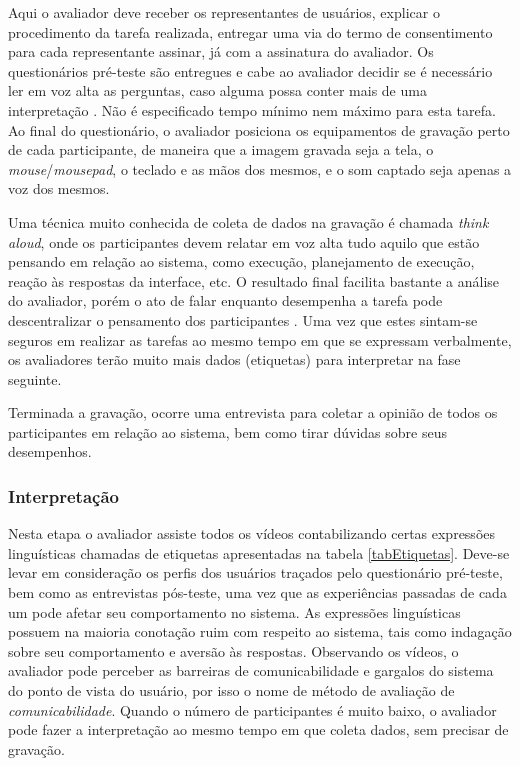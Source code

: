 \indent Aqui o avaliador deve receber os representantes de usuários, explicar o procedimento da tarefa realizada, entregar uma via do termo de consentimento para cada representante assinar, já com a assinatura do avaliador. Os questionários pré-teste são entregues e cabe ao avaliador decidir se é necessário ler em voz alta as perguntas, caso alguma possa conter mais de uma interpretação \cite[p. 309]{IHCbook}. Não é especificado tempo mínimo nem máximo para esta tarefa. Ao final do questionário, o avaliador posiciona os equipamentos de gravação perto de cada participante, de maneira que a imagem gravada seja a tela, o \textit{mouse}/\textit{mousepad}, o teclado e as mãos dos mesmos, e o som captado seja apenas a voz dos mesmos. 

\indent Uma técnica muito conhecida de coleta de dados na gravação é chamada \textit{think aloud}, onde os participantes devem relatar em voz alta tudo aquilo que estão pensando em relação ao sistema, como execução, planejamento de execução, reação às respostas da interface, etc. O resultado final facilita bastante a análise do avaliador, porém o ato de falar enquanto desempenha a tarefa pode descentralizar o pensamento dos participantes \cite[p. 309]{IHCbook}. Uma vez que estes sintam-se seguros em realizar as tarefas ao mesmo tempo em que se expressam verbalmente, os avaliadores terão muito mais dados (etiquetas) para interpretar na fase seguinte.

\indent Terminada a gravação, ocorre uma entrevista para coletar a opinião de todos os participantes em relação ao sistema, bem como tirar dúvidas sobre seus desempenhos.

\subsubsection{Interpretação}

\indent Nesta etapa o avaliador assiste todos os vídeos contabilizando certas expressões linguísticas chamadas de etiquetas apresentadas na tabela \ref{tabEtiquetas}. Deve-se levar em consideração os perfis dos usuários traçados pelo questionário pré-teste, bem como as entrevistas pós-teste, uma vez que as experiências passadas de cada um pode afetar seu comportamento no sistema. As expressões linguísticas possuem na maioria conotação ruim com respeito ao sistema, tais como indagação sobre seu comportamento e aversão às respostas. Observando os vídeos, o avaliador pode perceber as barreiras de comunicabilidade e gargalos do sistema do ponto de vista do usuário, por isso o nome de método de avaliação de \textit{comunicabilidade}. Quando o número de participantes é muito baixo, o avaliador pode fazer a interpretação ao mesmo tempo em que coleta dados, sem precisar de gravação.

